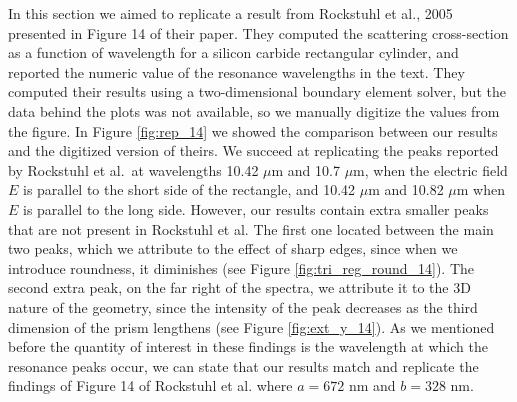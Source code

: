 In this section we aimed to replicate a result from Rockstuhl et al., 2005 \cite{rockstuhl2005} presented in Figure 14 of their paper. 
They computed the scattering cross-section as a function of wavelength for a silicon carbide rectangular cylinder, and reported the
numeric value of the resonance wavelengths in the text. They computed their results using a two-dimensional boundary element solver, 
but the data behind the plots was not available, so we manually digitize the values from the figure. In Figure \ref{fig:rep_14} we 
showed the comparison between our results and the digitized version of theirs. We succeed at replicating the peaks reported by 
Rockstuhl et al.\ at wavelengths 10.42 $\mu$m and 10.7 $\mu$m,  when the electric field $E$ is parallel to the short side of 
the rectangle, and 10.42 $\mu$m and 10.82 $\mu$m when $E$ is parallel to the long side. However, our results contain extra smaller peaks 
that are not present in Rockstuhl et al. The first one located between the main two peaks, which we attribute to the effect of sharp edges, 
since when we introduce roundness, it diminishes (see Figure \ref{fig:tri_reg_round_14}). The second extra peak, on the far right of the spectra, 
we attribute it to the 3D nature of the geometry, since the intensity of the peak decreases as the third dimension of the prism lengthens
(see Figure \ref{fig:ext_y_14}). As we mentioned before the quantity of interest in these findings is the wavelength at which the resonance peaks
occur, we can state that our results match and replicate the findings of Figure 14 of Rockstuhl et al. where $a = 672$ nm and $b = 328$ nm.
